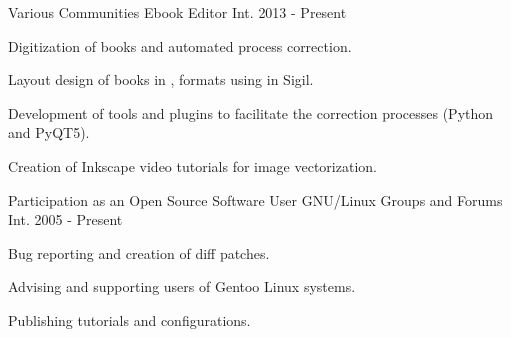 


\begin{cventries}

  \cventry
    {Various Communities} %
    {Ebook Editor} %
    {Int.} %
    {2013 - Present} %
    {
      \begin{cvitems} %
        \item {Digitization of books and automated  process correction.}
        \item {Layout design of books in ,  formats using  in Sigil.}
        \item {Development of tools and plugins to facilitate the correction processes (Python and PyQT5).}
        \item {Creation of Inkscape video tutorials for image vectorization.}
      \end{cvitems}
    }

  \cventry
    {Participation as an Open Source Software User} %
    {GNU/Linux Groups and Forums} %
    {Int.} %
    {2005 - Present} %
    {
      \begin{cvitems} %
        \item {Bug reporting and creation of diff patches.}
        \item {Advising and supporting users of Gentoo Linux systems.}
        \item {Publishing tutorials and configurations.}
      \end{cvitems}
    }


\end{cventries}
